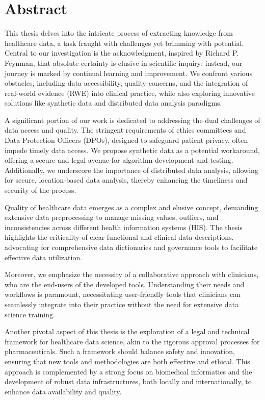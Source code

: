 \chapter*{Abstract}

This thesis delves into the intricate process of extracting knowledge from healthcare data, a task fraught with challenges yet brimming with potential. Central to our investigation is the acknowledgment, inspired by Richard P. Feynman, that absolute certainty is elusive in scientific inquiry; instead, our journey is marked by continual learning and improvement. We confront various obstacles, including data accessibility, quality concerns, and the integration of real-world evidence (RWE) into clinical practice, while also exploring innovative solutions like synthetic data and distributed data analysis paradigms.

A significant portion of our work is dedicated to addressing the dual challenges of data access and quality. The stringent requirements of ethics committees and Data Protection Officers (DPOs), designed to safeguard patient privacy, often impede timely data access. We propose synthetic data as a potential workaround, offering a secure and legal avenue for algorithm development and testing. Additionally, we underscore the importance of distributed data analysis, allowing for secure, location-based data analysis, thereby enhancing the timeliness and security of the process.

Quality of healthcare data emerges as a complex and elusive concept, demanding extensive data preprocessing to manage missing values, outliers, and inconsistencies across different health information systems (HIS). The thesis highlights the criticality of clear functional and clinical data descriptions, advocating for comprehensive data dictionaries and governance tools to facilitate effective data utilization.

Moreover, we emphasize the necessity of a collaborative approach with clinicians, who are the end-users of the developed tools. Understanding their needs and workflows is paramount, necessitating user-friendly tools that clinicians can seamlessly integrate into their practice without the need for extensive data science training.

Another pivotal aspect of this thesis is the exploration of a legal and technical framework for healthcare data science, akin to the rigorous approval processes for pharmaceuticals. Such a framework should balance safety and innovation, ensuring that new tools and methodologies are both effective and ethical. This approach is complemented by a strong focus on biomedical informatics and the development of robust data infrastructures, both locally and internationally, to enhance data availability and quality.

